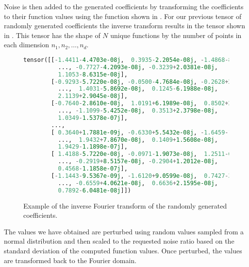 Noise is then added to the generated coefficients by transforming the coefficients to their function values using the function shown in . For our previous tensor of randomly generated coefficients the inverse transform results in the tensor shown in . This tensor has the shape of \(N\) unique functions by the number of points in each dimension \(n_1,n_2,\ldots,n_d\).
\begin{figure}[H]
  \centering
  \begin{lstlisting}[language=Python]
  tensor([[-1.4411-4.4703e-08j,  0.3935-2.2054e-08j, -1.4868-8.9565e-09j,
          ..., -0.7727-4.2093e-08j, -0.3239+2.0381e-08j,
          1.1053-8.6315e-08j],
        [-0.9293-5.7220e-08j, -0.0500-4.7684e-08j, -0.2628+2.8610e-08j,
          ...,  1.4031-5.8692e-08j,  0.1245-6.1988e-08j,
          2.1139+2.9045e-08j],
        [-0.7640-2.8610e-08j,  1.0191+6.1989e-08j,  0.8502+2.7388e-08j,
          ..., -1.1099-5.4252e-08j,  0.3513+2.3798e-08j,
          1.0349-1.5378e-07j],
        ...,
        [ 0.3640+1.7881e-09j, -0.6330+5.5432e-08j, -1.6459-1.1356e-07j,
          ...,  1.9432+7.8670e-08j,  0.1409+1.5608e-08j,
          1.9429-1.1898e-07j],
        [ 1.4188-5.7220e-08j, -0.0971-1.9073e-08j,  1.2511-6.4455e-09j,
          ..., -0.2919+8.5157e-08j, -0.2904+1.2012e-08j,
          0.4568-1.1858e-07j],
        [-1.1443-9.5367e-09j, -1.6120+9.0599e-08j,  0.7427-3.5344e-08j,
          ..., -0.6559+4.0621e-08j,  0.6636+2.1595e-08j,
          0.7892-6.0481e-08j]])
\end{lstlisting}
  \caption{Example of the inverse Fourier transform of the randomly generated coefficients.}\label{fig:example_clean_inv_transform}
\end{figure}

The values we have obtained are perturbed using random values sampled from a normal distribution and then scaled to the requested noise ratio based on the standard deviation of the computed function values. Once perturbed, the values are transformed back to the Fourier domain.

